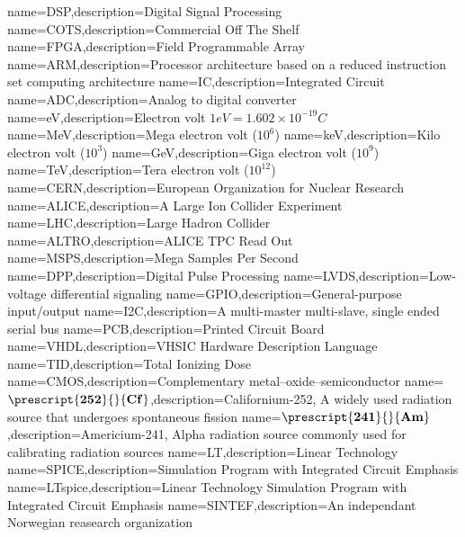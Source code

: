  {name=DSP,description={Digital Signal Processing}}
 {name=COTS,description={Commercial Off The Shelf}}
 {name=FPGA,description={Field Programmable Array}}
 {name=ARM,description={Processor architecture based on a reduced instruction set computing architecture}}
 {name=IC,description={Integrated Circuit}}
 {name=ADC,description={Analog to digital converter}}
 {name=eV,description={Electron volt $\unit{1}{eV}=\unit{1.602\times10^{-19}}{C}$}}
 {name=MeV,description={Mega electron volt ($10^6$)}}
 {name=keV,description={Kilo electron volt ($10^3$)}}
 {name=GeV,description={Giga electron volt ($10^9$)}}
 {name=TeV,description={Tera electron volt ($10^12$)}}
 {name=CERN,description={European Organization for Nuclear Research}}
 {name=ALICE,description={A Large Ion Collider Experiment}}
 {name=LHC,description={Large Hadron Collider}}
 {name=ALTRO,description={ALICE TPC Read Out}}
 {name=MSPS,description={Mega Samples Per Second}}
 {name=DPP,description={Digital Pulse Processing}}
 {name=LVDS,description={Low-voltage differential signaling}}
 {name=GPIO,description={General-purpose input/output}}
 {name=I2C,description={A multi-master multi-slave, single ended serial bus}}
 {name=PCB,description={Printed Circuit Board}}
 {name=VHDL,description={VHSIC Hardware Description Language}}
 {name=TID,description={Total Ionizing Dose}}
 {name=CMOS,description={Complementary metal–oxide–semiconductor}}
 {name=$\prescript{\bf{252}}{}{\bf{Cf}}$,description={Californium-252, A widely used radiation source that undergoes spontaneous fission}}
 {name=$\prescript{\bf{241}}{}{\bf{Am}}$,description={Americium-241, Alpha radiation source commonly used for calibrating radiation sources}}
 {name=LT,description={Linear Technology}}
 {name=SPICE,description={Simulation Program with Integrated Circuit Emphasis}}
 {name=LTspice,description={Linear Technology Simulation Program with Integrated Circuit Emphasis}}
 {name=SINTEF,description={An independant Norwegian reasearch organization}}
